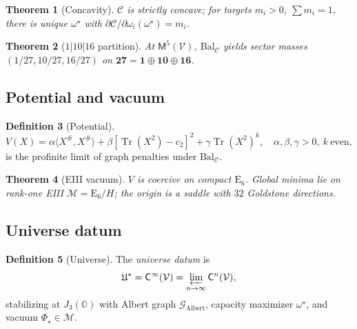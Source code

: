 \documentclass[11pt]{article}
\theoremstyle{plain}
\newtheorem{theorem}{Theorem}[section]
\theoremstyle{definition}
\newtheorem{definition}[theorem]{Definition}
\theoremstyle{remark}
\numberwithin{equation}{section}
\newcommand{\jalg}{J_3(\mathbb{O})}
\newcommand{\E}[1]{\mathrm{E}_{#1}}
\newcommand{\Tr}{\operatorname{Tr}}
\newcommand{\Void}{\mathcal{V}}
\newcommand{\Mirror}{\mathsf{M}}
\newcommand{\Climb}{\mathsf{C}}
\newcommand{\capacity}{\mathcal{C}}
\newcommand{\orderparam}{\Phi}
\begin{document}
\begin{theorem}[Concavity]\label{thm:concave}
$\capacity$ is strictly concave; for targets $m_i>0$, $\sum m_i=1$, there is
unique $\omega^\star$ with $\partial\capacity/\partial\omega_i(\omega^\star)=m_i$.
\end{theorem}

\begin{theorem}[$1|10|16$ partition]\label{thm:partition}
At $\Mirror^5(\Void)$, $\mathrm{Bal}_{\mathcal{C}}$ yields sector masses
$(1/27,10/27,16/27)$ on $\mathbf{27}=\mathbf{1}\oplus\mathbf{10}\oplus\mathbf{16}$.
\end{theorem}

\subsection{Potential and vacuum}
\label{sec:universe:potential}

\begin{definition}[Potential]\label{def:potential}
\begin{equation}\label{eq:potential}
  V(X)=\alpha\langle X^{\#},X^{\#}\rangle+\beta[\Tr(X^2)-c_2]^2+\gamma\Tr(X^2)^k,
  \quad \alpha,\beta,\gamma>0,\ k\ \text{even},
\end{equation}
is the profinite limit of graph penalties under $\mathrm{Bal}_{\mathcal{C}}$.
\end{definition}

\begin{theorem}[EIII vacuum]\label{thm:vacuum}
$V$ is coercive on compact $\E{6}$. Global minima lie on rank-one EIII
$\mathcal{M}=\E{6}/H$; the origin is a saddle with $32$ Goldstone directions.
\end{theorem}

\subsection{Universe datum}
\label{sec:universe:datum}

\begin{definition}[Universe]\label{def:universe}
The \emph{universe datum} is
\begin{equation}\label{eq:universe}
  \mathfrak{U}^\star=\Climb^\infty(\Void)
  =\varprojlim_{n\to\infty}\Climb^n(\Void),
\end{equation}
stabilizing at $\jalg$ with Albert graph $\mathcal{G}_{\mathrm{Albert}}$,
capacity maximizer $\omega^\star$, and vacuum $\orderparam_\star\in\mathcal{M}$.
\end{definition}
\end{document}
